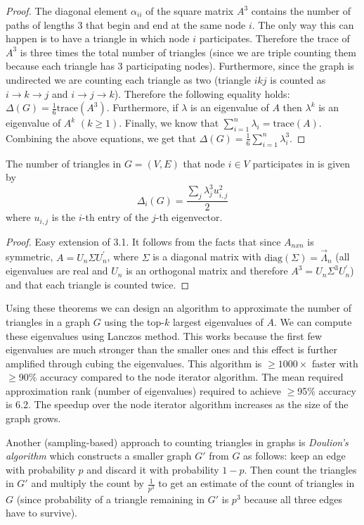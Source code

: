 \medskip

\begin{proof}
The diagonal element $\alpha_{ii}$ of the square matrix $A^3$ contains the number of paths of lengths 3 that begin and end at the same node $i$. The only way this can happen is to have a triangle in which node $i$ participates. Therefore the trace of $A^3$ is three times the total number of triangles (since we are triple counting them because each triangle has 3 participating nodes). Furthermore, since the graph is undirected we are counting each triangle as two (triangle $ikj$ is counted as $i \rightarrow k \rightarrow j$ and $i \rightarrow j \rightarrow k$). Therefore the following equality holds: $\Delta(G) = \frac{1}{6} \text{trace}(A^3)$. Furthermore, if $\lambda$ is an eigenvalue of $A$ then $\lambda^k$ is an eigenvalue of $A^k$ $(k \geq 1)$. Finally, we know that $\sum_{i=1}^n \lambda_i = \text{trace}(A)$. Combining the above equations, we get that $\Delta(G) = \frac{1}{6} \sum_{i=1}^n \lambda_i^3$.
\end{proof}

\bigskip

\begin{theorem}[EigenTriangleLocal]
The number of triangles in $G=(V,E)$ that node $i \in V$ participates in is given by
$$
\Delta_i(G) = \frac{\sum_j \lambda_j^3 u_{i,j}^2}{2}
$$
where $u_{i,j}$ is the $i$-th entry of the $j$-th eigenvector.
\end{theorem}

\medskip

\begin{proof}
Easy extension of 3.1. It follows from the facts that since $A_{nxn}$ is symmetric, $A = U_n \Sigma U_n^{'}$, where $\Sigma$ is a diagonal matrix with $\text{diag}(\Sigma) = \vec{\Lambda}_n$ (all eigenvalues are real and $U_n$ is an orthogonal matrix and therefore $A^3 = U_n \Sigma^3 U_n^{'}$) and that each triangle is counted twice.
\end{proof}

Using these theorems we can design an algorithm to approximate the number of triangles in a graph $G$ using the top-$k$ largest eigenvalues of $A$. We can compute these eigenvalues using Lanczos method. This works because the first few eigenvalues are much stronger than the smaller ones and this effect is further amplified through cubing the eigenvalues. This algorithm is $\geq 1000\times$ faster with $\geq$90\% accuracy compared to the node iterator algorithm. The mean required approximation rank (number of eigenvalues) required to achieve $\geq$95\% accuracy is 6.2. The speedup over the node iterator algorithm increases as the size of the graph grows.

Another (sampling-based) approach to counting triangles in graphs is \emph{Doulion's algorithm} which constructs a smaller graph $G'$ from $G$ as follows: keep an edge with probability $p$ and discard it with probability $1-p$. Then count the triangles in $G'$ and multiply the count by $\frac{1}{p^3}$ to get an estimate of the count of triangles in $G$ (since probability of a triangle remaining in $G'$ is $p^3$ because all three edges have to survive).